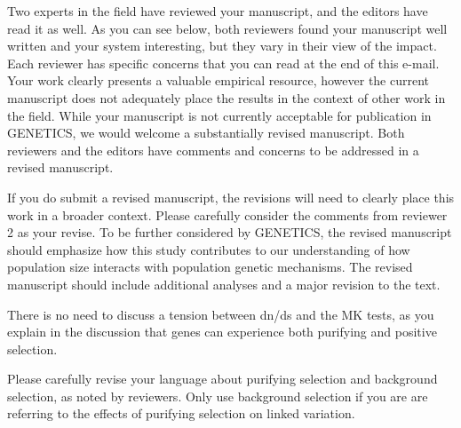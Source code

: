 \begin{itquote}
Two experts in the field have reviewed your manuscript, and the editors
have read it as well. As you can see below, both reviewers found your
manuscript well written and your system interesting, but they vary in
their view of the impact. Each reviewer has specific concerns that you
can read at the end of this e-mail. Your work clearly presents a valuable
empirical resource, however the current manuscript does not adequately
place the results in the context of other work in the field. While your
manuscript is not currently acceptable for publication in GENETICS, we
would welcome a substantially revised manuscript. Both reviewers and the
editors have comments and concerns to be addressed in a revised
manuscript.

If you do submit a revised manuscript, the revisions will need to clearly
place this work in a broader context. Please carefully consider the
comments from reviewer 2 as your revise. To be further considered by
GENETICS, the revised manuscript should emphasize how this study
contributes to our understanding of how population size interacts with
population genetic mechanisms. The revised manuscript should include
additional analyses and a major revision to the text.
\end{itquote}


\begin{point}{} %
There is no need to discuss a tension between dn/ds and the MK tests, as
you explain in the discussion that genes can experience both purifying
and positive selection.
\end{point}


\begin{point}{} %
Please carefully revise your language about purifying selection and
background selection, as noted by reviewers. Only use background
selection if you are are referring to the effects of purifying selection
on linked variation.
\end{point}


